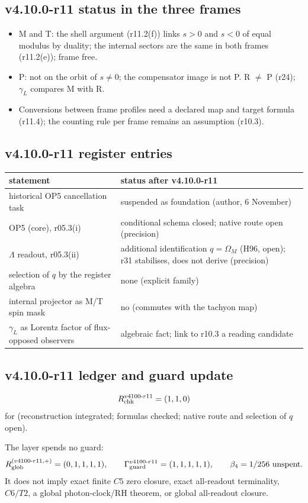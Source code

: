 \subsection*{v4.10.0-r11 status in the three frames}
\label{subsec:v4100-r11-frames}

\begin{itemize}[leftmargin=2em]
\item M and T: the shell argument (r11.2(f)) links \(s>0\) and \(s<0\) of equal modulus by duality; the internal sectors are the same in both frames (r11.2(e));
frame free.
\item P: not on the orbit of \(s\neq0\); the compensator image is not P.  R \(\neq\) P (r24); \(\gamma_L\) compares M with R.
\item Conversions between frame profiles need a declared map and target formula (r11.4); the counting rule per frame remains an assumption (r10.3).
\end{itemize}

\subsection*{v4.10.0-r11 register entries}
\label{subsec:v4100-r11-register}

\begin{center}
\small
\begin{tabular}{@{}>{\raggedright\arraybackslash}p{}>{\raggedright\arraybackslash}p{}@{}}
\toprule
statement & status after v4.10.0-r11\\
\midrule
historical OP5 cancellation task & suspended as foundation (author, 6 November)\\
OP5 (core), r05.3(i) & conditional schema closed; native route open (precision)\\
\(\Lambda\) readout, r05.3(ii) & additional identification \(q=\Omega_M\) (H96, open); r31 stabilises, does not derive (precision)\\
selection of \(q\) by the register algebra & none (explicit family)\\
internal projector as M/T spin mask & no (commutes with the tachyon map)\\
\(\gamma_L\) as Lorentz factor of flux-opposed observers & algebraic fact; link to r10.3 a reading candidate\\
\bottomrule
\end{tabular}
\end{center}

\subsection*{v4.10.0-r11 ledger and guard update}
\label{subsec:v4100-r11-ledger-guard}

\[
R_{\rm chk}^{v4100\text{-}r11}=(1,1,0)
\]
for (reconstruction integrated; formulas checked; native route and selection of \(q\) open).

The layer spends no guard:
\[
R_{\rm glob}^{(v4100\text{-}r11,+)}=(0,1,1,1,1),
\qquad
\Gamma_{\rm guard}^{v4100\text{-}r11}=(1,1,1,1,1),
\qquad
\beta_4=1/256\ \text{unspent}.
\]
It does not imply exact finite \(C5\) zero closure, exact all-readout terminality,
\(C6/T2\), a global photon-clock/RH theorem, or global all-readout closure.
